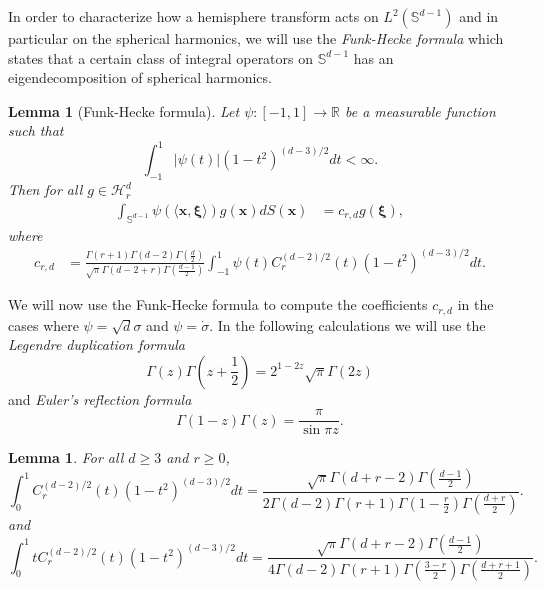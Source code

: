 \documentclass{article}
\newtheorem{lemma}[theorem]{Lemma}
\theoremstyle{definition}
\newcommand*{\R}{\mathbb{R}}
\newcommand{\mc}{\mathcal}
\renewcommand{\S}{\mathbb{S}}
\def\vx{{\bm{x}}}
\begin{document}
In order to characterize how a hemisphere transform acts on $L^2(\S^{d -1 })$ and in particular on the spherical harmonics, we will use the \emph{Funk-Hecke formula} \citep[see][]{seeley1966spherical} which states that a certain class of integral operators on $\S^{d - 1}$ has an eigendecomposition of spherical harmonics. 
\begin{lemma}[Funk-Hecke formula]\label{lem:funk-hecke}
    Let $\psi: [-1, 1] \to \R$ be a measurable function such that \[\int_{-1}^1 |\psi(t)|(1 - t^2)^{(d - 3)/2}dt < \infty.\]
    Then for all $g \in \mc{H}_r^d$
    \begin{align*}
        \int_{\S^{d - 1}} \psi(\langle \vx, \bm{\xi}\rangle)g(\vx) dS(\vx) &= c_{r,d}g(\bm{\xi}),
    \end{align*}
    where
    \begin{align*}
        c_{r,d} &= \frac{\Gamma(r + 1)\Gamma(d - 2)\Gamma\left(\frac{d}{2}\right)  }{\sqrt{\pi}\Gamma(d - 2 + r)\Gamma\left(\frac{d - 1}{2}\right) } \int_{-1}^1 \psi(t)C_r^{(d - 2)/2}(t)(1 - t^2)^{(d - 3)/2}dt.
    \end{align*}
\end{lemma}
We will now use the Funk-Hecke formula to compute the coefficients $c_{r, d}$ in the cases where $\psi = \sqrt{d}\sigma$ and $\psi = \dot{\sigma}$. In the following calculations we will use the \emph{Legendre duplication formula}
\[\Gamma(z)\Gamma\left(z + \frac{1}{2} \right) = 2^{1 - 2z}\sqrt{\pi}\Gamma(2z) \]
and \emph{Euler's reflection formula}
\[\Gamma(1 - z)\Gamma(z) = \frac{\pi}{\sin \pi z}. \]
\begin{lemma}\label{lem:gradshteyn}
    For all $d \geq 3$ and $r \geq 0$,
    \[\int_0^1 C_r^{(d-2)/2}(t)(1 - t^2)^{(d-3)/2}dt = \frac{\sqrt{\pi}\Gamma(d + r - 2)\Gamma\left(\frac{d - 1}{2}\right)  }{2\Gamma(d - 2) \Gamma(r + 1)\Gamma\left(1 - \frac{r}{2}\right)\Gamma\left(\frac{d + r}{2} \right) }. \]
    and
    \[\int_0^1 t C_r^{(d - 2)/2}(t)(1 - t^2)^{(d - 3)/2}dt = \frac{\sqrt{\pi}\Gamma(d + r - 2)\Gamma\left(\frac{d - 1}{2}\right) }{4\Gamma(d - 2)\Gamma(r + 1)\Gamma\left(\frac{3 - r}{2}\right)\Gamma\left(\frac{d + r + 1}{2}\right) }.\]
\end{lemma}
\end{document}
